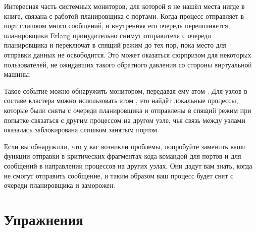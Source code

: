 Интересная часть системных мониторов, для которой я не нашёл места нигде в книге, связана с работой планировщика с портами. Когда процесс отправляет в порт слишком много сообщений, и внутренняя его очередь переполняется, планировщики Erlang принудительно снимут отправителя с очереди планировщика и переключат в спящий режим до тех пор, пока место для отправки данных не освободится. Это может оказаться сюрпризом для некоторых пользователей, не ожидавших такого обратного давления со стороны виртуальной машины.

Такое событие можно обнаружить монитором, передавая ему атом . Для узлов в составе кластера можно использовать атом , это найдёт локальные процессы, которые были сняты с очереди планировщика и отправлены в спящий режим при попытке связаться с другим процессом на другом узле, чья связь между узлами оказалась заблокирована слишком занятым портом.

Если вы обнаружили, что у вас возникли проблемы, попробуйте заменить ваши функции отправки в критических фрагментах кода командой  для портов и  для сообщений в направлении процессов на других узлах. Они дадут вам знать, когда не смогут отправить сообщение, и таким образом ваш процесс будет снят с очереди планировщика и заморожен.


\section{Упражнения}

